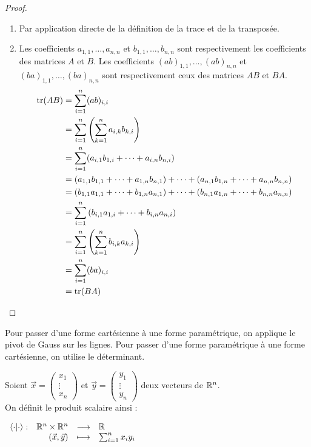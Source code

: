 \begin{proof}
	\leavevmode
    \begin{enumerate}
        \item Par application directe de la définition de la trace et de la transposée.
        \item Les coefficients $a_{1,1}, \ldots, a_{n,n}$ et $b_{1,1}, \ldots, b_{n,n}$ sont respectivement les coefficients des matrices $A$ et $B$. Les coefficients $(ab)_{1,1}, \ldots, (ab)_{n,n}$ et $(ba)_{1,1}, \ldots, (ba)_{n,n}$ sont respectivement ceux des matrices $AB$ et $BA$.
        \begin{align*}
        	\tr(AB) &= \sum_{i=1}^n (ab)_{i,i} \\
        			&= \sum_{i=1}^n \left( \sum_{k=1}^n a_{i,k} b_{k,i} \right) \\
        			&= \sum_{i=1}^n (a_{i,1} b_{1,i} + \cdots + a_{i,n} b_{n,i}) \\
        			&= (a_{1,1} b_{1,1} + \cdots + a_{1,n} b_{n,1}) + \cdots + (a_{n,1} b_{1,n} + \cdots + a_{n,n} b_{n,n}) \\
        			&= (b_{1,1}a_{1,1} + \cdots + b_{1,n}a_{n,1}) + \cdots + (b_{n,1} a_{1,n} + \cdots + b_{n,n} a_{n,n}) \\
        			&= \sum_{i=1}^n \left( b_{i,1} a_{1,i} + \cdots + b_{i,n} a_{n,i} \right) \\
        			&= \sum_{i=1}^n \left( \sum_{k=1}^n b_{i,k} a_{k,i} \right) \\
        			&= \sum_{i=1}^n (ba)_{i,i} \\
        			&= \tr(BA)
        \end{align*}
    \end{enumerate}
\end{proof}

\begin{proposition}
    Pour passer d'une forme cartésienne à une forme paramétrique, on applique le pivot de Gauss sur les lignes.
    Pour passer d'une forme paramétrique à une forme cartésienne, on utilise le déterminant.
\end{proposition}

\begin{definition} 
	Soient $\vec{x} = \begin{pmatrix} x_1 \\ \vdots \\ x_n \end{pmatrix}$ et $\vec{y} = \begin{pmatrix} y_1 \\ \vdots \\ y_n \end{pmatrix}$ deux vecteurs de $\mathbb{R}^n$.
	\\
	On définit le produit scalaire ainsi :
	\begin{center}
		$
		\begin{array}{rrcl} \langle \cdot | \cdot \rangle : & \mathbb{R}^n \times \mathbb{R}^n & \longrightarrow & \mathbb{R} \\ & (\vec{x}, \vec{y}) & \longmapsto & \sum_{i = 1}^n x_i y_i \end{array}
		$
	\end{center}
\end{definition}

